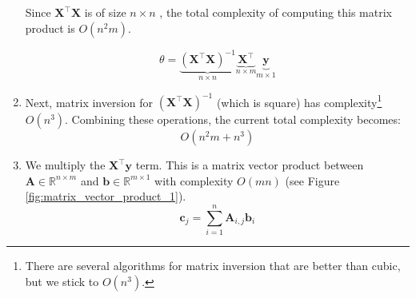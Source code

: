 \begin{enumerate}
          Since \( \bm{X}^\top \bm{X} \) is of size \( n \times n \)  , the total complexity of computing this matrix product is \( O(n^2 m) \).

          \[
              \theta = \underbrace{(\bm{X}^\top \bm{X})^{-1}}_{n \times n}
              \underbrace{\bm{X}^\top}_{n \times m}
              \underbrace{\bm{y}}_{m \times 1}
          \]

    \item Next, matrix inversion for \( (\bm{X}^\top \bm{X})^{-1} \) (which is square) has complexity\footnote{There are several algorithms for matrix inversion that are better than cubic, but we stick to $O(n^3)$.}  \( O(n^3) \). Combining these operations, the current total complexity becomes:
          \[
              O(n^2 m + n^3)
          \]
    \item We multiply the \( \bm{X}^\top \bm{y} \) term. This is a matrix vector product between $\bm{A} \in \mathbb{R}^{n \times m}$ and $\bm{b} \in \mathbb{R}^{m \times 1}$ with complexity $O(mn)$ (see Figure \ref{fig:matrix_vector_product_1}).
          \[
              \bm{c}_j = \sum^n_{i=1} \bm{A}_{i,j} \bm{b}_i
          \]
          \begin{figure}[h!]
              \centering
\end{figure}
\end{enumerate}
